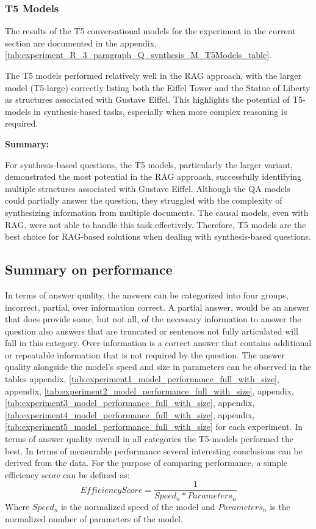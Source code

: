 \documentclass{wseas}
\begin{document}
\subsubsection{T5 Models}

The results of the T5 conversational models for the experiment in the current section
are documented in the appendix, \autoref{tab:experiment_R_3_paragraph_Q_synthesis_M_T5Models_table}.

The T5 models performed relatively well in the RAG approach, with the larger 
model (T5-large) correctly listing both the Eiffel Tower and the Statue of Liberty
as structures associated with Gustave Eiffel. This highlights the potential of 
T5-models in synthesis-based tasks, especially when more complex reasoning is required.

\textbf{Summary:}

For synthesis-based questions, the T5 models, particularly the larger
variant, demonstrated the most potential in the RAG approach,
successfully identifying multiple structures associated with Gustave
Eiffel. Although the QA models could partially answer the question, they
struggled with the complexity of synthesizing information from multiple
documents. The causal models, even with RAG, were not able to handle
this task effectively. Therefore, T5 models are the best choice for
RAG-based solutions when dealing with synthesis-based questions.

\subsection{Summary on performance}
In terms of answer quality, the answers can be categorized into four groups, incorrect, partial, 
over information correct. A partial answer, would be an answer that does provide some, but not
all, of the necessary information to answer the question also answers that are truncated or sentences
not fully articulated will fall in this category. Over-information is a correct answer that
contains additional or repeatable information that is not required by the question. The answer
quality alongside the model's speed and size in parameters can be observed in the tables 
appendix, \autoref{tab:experiment1_model_performance_full_with_size}, appendix, \autoref{tab:experiment2_model_performance_full_with_size},  appendix,
\autoref{tab:experiment3_model_performance_full_with_size}, appendix, \autoref{tab:experiment4_model_performance_full_with_size}, appendix,
\autoref{tab:experiment5_model_performance_full_with_size} for each experiment.
In terms of answer quality overall in all categories the T5-models performed the best. 
In terms of measurable performance several interesting conclusions can be derived from the data.
For the purpose of comparing performance, a simple efficiency score can be defined as:
\begin{equation}
  \textstyle  
EfficiencyScore = \frac{1}{Speed_n * Parameters_n}
  \label{eq:efficiency_score}
\end{equation}
Where $Speed_n$ is the normalized speed of the model and $Parameters_n$ is the normalized number of parameters
of the model.
\end{document}
